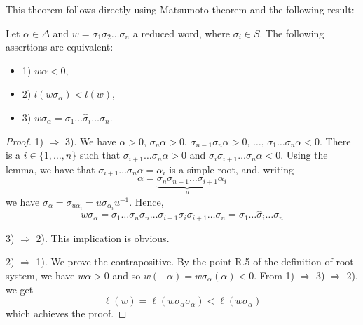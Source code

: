 \documentclass[envcountsame,envcountchap]{svmono}
\begin{document}
This theorem follows directly using Matsumoto theorem and the following result:

\begin{theorem}
Let $\alpha \in \Delta$ and $w = \sigma_1 \sigma_2 \ldots \sigma_n$ a reduced word, where $\sigma_i \in S$. The following assertions are equivalent:
\begin{itemize}
\item 1) $w \alpha < 0$,
\item 2) $l(w \sigma_\alpha) < l(w)$,
\item 3) $w \sigma_\alpha = \sigma_1 \ldots \hat{\sigma}_i \ldots \sigma_n$.
\end{itemize}
\end{theorem} 
\begin{proof}
1) $\Rightarrow$ 3). We have $\alpha> 0$, $\sigma_n \alpha > 0$, $\sigma_{n-1}\sigma_n \alpha > 0$, $\ldots$, $\sigma_1 \ldots \sigma_n \alpha <0$. There is a $i \in \{1, \ldots, n\}$ such that $\sigma_{i+1} \ldots \sigma_n \alpha > 0$ and $\sigma_i \sigma_{i+1} \ldots \sigma_n \alpha < 0$. Using the lemma, we have that $\sigma_{i+1} \ldots \sigma_n \alpha = \alpha_i$ is a simple root, and, writing
\begin{equation}
\alpha =  \underbrace{\sigma_n \sigma_{n-1} \ldots \sigma_{i+1}}_{u} \alpha_i  
\end{equation} we have $\sigma_\alpha = \sigma_{u \alpha_i} = u \sigma_{\alpha_i} u^{-1}$. Hence,
\begin{equation}
w \sigma_\alpha = \sigma_1 \ldots \sigma_n \sigma_n \ldots \sigma_{i+1} \sigma_i \sigma_{i+1} \ldots \sigma_n = \sigma_1 \ldots \hat{\sigma}_i \ldots \sigma_n
\end{equation}


3) $\Rightarrow$ 2). This implication is obvious. 

2) $\Rightarrow$ 1). We prove the contrapositive. By the point R.5 of the definition of root system, we have $w \alpha > 0$ and so $w(-\alpha) = w \sigma_\alpha (\alpha) < 0$. From 1) $\Rightarrow$ 3) $\Rightarrow$ 2), we get
\begin{equation}
\ell (w) = \ell (w \sigma_\alpha \sigma_\alpha) < \ell (w \sigma_\alpha)
\end{equation}  which achieves the proof. 

\end{proof}
	
\end{document}
